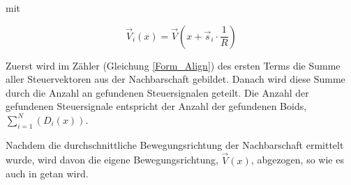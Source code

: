 \documentclass[a4paper, 10pt, journal]{wissarbIEEE}      %
\begin{document}
mit

\begin{equation}
\vec{V}_i(x) = \vec{V}(x + \vec{s}_i \cdot \dfrac{1}{R})
\label{Form_Vi}
\end{equation}

Zuerst wird im Zähler (Gleichung \ref{Form_Align}) des ersten Terms die Summe aller Steuervektoren aus der Nachbarschaft gebildet. 
Danach wird diese Summe durch die Anzahl an gefundenen Steuersignalen geteilt. Die Anzahl der gefundenen Steuersignale entspricht der Anzahl der gefundenen Boids, $\sum_{i=1}^N(D_i(x))$.

Nachdem die durchschnittliche Bewegungsrichtung der Nachbarschaft ermittelt wurde, wird davon die eigene Bewegungsrichtung, $\vec{V}(x)$, abgezogen, so wie es auch in \cite{Reynolds99steeringbehaviors} getan wird. 





\end{document}
